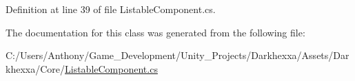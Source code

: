 Definition at line 39 of file Listable\-Component.\-cs.



The documentation for this class was generated from the following file\-:\begin{DoxyCompactItemize}
\item 
C\-:/\-Users/\-Anthony/\-Game\-\_\-\-Development/\-Unity\-\_\-\-Projects/\-Darkhexxa/\-Assets/\-Darkhexxa/\-Core/\hyperlink{_listable_component_8cs}{Listable\-Component.\-cs}\end{DoxyCompactItemize}
